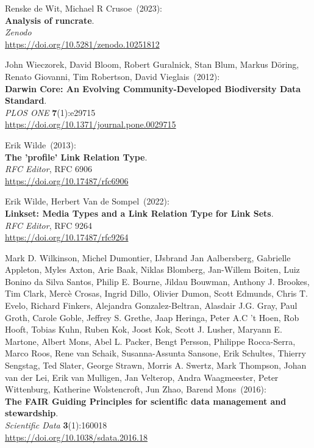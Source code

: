 \begin{thebibliography}{9}
Renske de Wit, Michael R Crusoe~(2023): \\
\textbf{Analysis of runcrate}.\\
\emph{Zenodo}\\
\url{https://doi.org/10.5281/zenodo.10251812}

John Wieczorek, David Bloom, Robert Guralnick, Stan Blum, Markus Döring, Renato Giovanni, Tim Robertson, David Vieglais~(2012): \\
\textbf{Darwin {Core}: {An Evolving Community-Developed Biodiversity Data Standard}}.\\
\emph{PLOS ONE} \textbf{7}(1):e29715 \\
\url{https://doi.org/10.1371/journal.pone.0029715}

Erik Wilde~(2013): \\
\textbf{The 'profile' Link Relation Type}.\\
\emph{RFC Editor}, RFC 6906\\
\url{https://doi.org/10.17487/rfc6906}

Erik Wilde, Herbert Van de Sompel~(2022): \\
\textbf{Linkset: Media Types and a Link Relation Type for Link Sets}.\\
\emph{RFC Editor}, RFC 9264\\
\url{https://doi.org/10.17487/rfc9264}

Mark D. Wilkinson, Michel Dumontier, IJsbrand Jan Aalbersberg, Gabrielle Appleton, Myles Axton, Arie Baak, Niklas Blomberg, Jan-Willem Boiten, Luiz Bonino da Silva Santos, Philip E. Bourne, Jildau Bouwman, Anthony J. Brookes, Tim Clark, Mercè Crosas, Ingrid Dillo, Olivier Dumon, Scott Edmunds, Chris T. Evelo, Richard Finkers, Alejandra Gonzalez-Beltran, Alasdair J.G. Gray, Paul Groth, Carole Goble, Jeffrey S. Grethe, Jaap Heringa, Peter A.C 't Hoen, Rob Hooft, Tobias Kuhn, Ruben Kok, Joost Kok, Scott J. Lusher, Maryann E. Martone, Albert Mons, Abel L. Packer, Bengt Persson, Philippe Rocca-Serra, Marco Roos, Rene van Schaik, Susanna-Assunta Sansone, Erik Schultes, Thierry Sengstag, Ted Slater, George Strawn, Morris A. Swertz, Mark Thompson, Johan van der Lei, Erik van Mulligen, Jan Velterop, Andra Waagmeester, Peter Wittenburg, Katherine Wolstencroft, Jun Zhao, Barend Mons~(2016): \\
\textbf{The FAIR Guiding Principles for scientific data management and stewardship}.\\
\emph{Scientific Data} \textbf{3}(1):160018\\
\url{https://doi.org/10.1038/sdata.2016.18}


\end{thebibliography}
